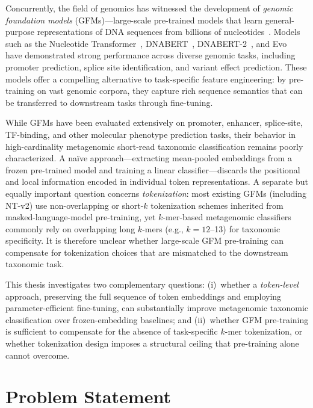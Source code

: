 Concurrently, the field of genomics has witnessed the development of \emph{genomic foundation models} (GFMs)---large-scale pre-trained models that learn general-purpose representations of DNA sequences from billions of nucleotides~\cite{DallaTorre2023}. 
Models such as the Nucleotide Transformer~\cite{DallaTorre2023}, DNABERT~\cite{Ji2021}, DNABERT-2~\cite{Zhou2024dnabert2}, and Evo~\cite{Nguyen2024} have demonstrated strong performance across diverse genomic tasks, including promoter prediction, splice site identification, and variant effect prediction. 
These models offer a compelling alternative to task-specific feature engineering: by pre-training on vast genomic corpora, they capture rich sequence semantics that can be transferred to downstream tasks through fine-tuning.

While GFMs have been evaluated extensively on promoter, enhancer, splice-site, TF-binding, and other molecular phenotype prediction tasks, their behavior in high-cardinality metagenomic short-read taxonomic classification remains poorly characterized.
A na\"ive approach---extracting mean-pooled embeddings from a frozen pre-trained model and training a linear classifier---discards the positional and local information encoded in individual token representations.
A separate but equally important question concerns \emph{tokenization}: most existing GFMs (including NT-v2) use non-overlapping or short-$k$ tokenization schemes inherited from masked-language-model pre-training, yet $k$-mer-based metagenomic classifiers commonly rely on overlapping long $k$-mers (e.g., $k = 12$--13) for taxonomic specificity.
It is therefore unclear whether large-scale GFM pre-training can compensate for tokenization choices that are mismatched to the downstream taxonomic task.

This thesis investigates two complementary questions: (i)~whether a \emph{token-level} approach, preserving the full sequence of token embeddings and employing parameter-efficient fine-tuning, can substantially improve metagenomic taxonomic classification over frozen-embedding baselines; and (ii)~whether GFM pre-training is sufficient to compensate for the absence of task-specific $k$-mer tokenization, or whether tokenization design imposes a structural ceiling that pre-training alone cannot overcome.

\section{Problem Statement}
\label{sec:intro-problem}

